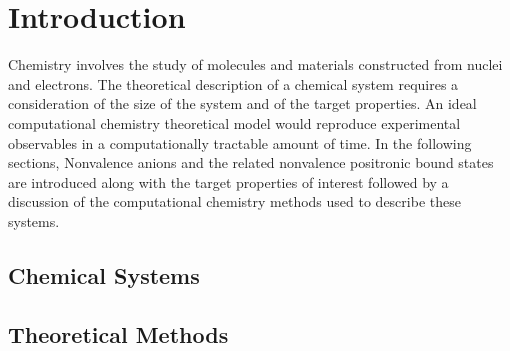 \chapter{Introduction}

Chemistry involves the study of molecules and materials constructed from nuclei and electrons.
The theoretical description of a chemical system requires a consideration of the size of the system and of the target properties.
An ideal computational chemistry theoretical model would reproduce experimental observables in a computationally tractable amount of time.
In the following sections, Nonvalence anions and the related nonvalence positronic bound states are introduced along with the target properties of interest followed by a discussion of the computational chemistry methods used to describe these systems.

\section{Chemical Systems}



\section{Theoretical Methods}










